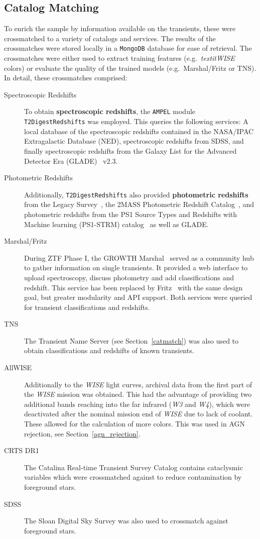 \subsection{Catalog Matching}
To enrich the sample by information available on the transients, these were crossmatched to a variety of catalogs and services. The results of the crossmatches were stored locally in a \texttt{MongoDB} database for ease of retrieval. The crossmatches were either used to extract training features (e.g.~\textit{textit{WISE}} colors) or evaluate the quality of the trained models (e.g.~Marshal/Fritz or TNS). In detail, these crossmatches comprised:

\begin{description}
  \item[Spectroscopic Redshifts] To obtain \textbf{spectroscopic redshifts}, the \texttt{AMPEL} module \texttt{T2DigestRedshifts} was employed. This queries the following services: A local database of the spectroscopic redshifts contained in the NASA/IPAC Extragalactic Database (NED), spectroscopic redshifts from SDSS, and finally spectroscopic redshifts from the Galaxy List for the Advanced Detector Era (GLADE)~ v2.3.
  \item[Photometric Redshifts] Additionally, \texttt{T2DigestRedshifts} also provided \textbf{photometric redshifts} from the Legacy Survey~, the 2MASS Photometric Redshift Catalog~, and photometric redshifts from the PS1 Source Types and Redshifts with Machine learning (PS1-STRM) catalog~ as well as GLADE.
  \item[Marshal/Fritz] During ZTF Phase I, the GROWTH Marshal~ served as a community hub to gather information on single transients. It provided a web interface to upload spectroscopy, discuss photometry and add classifications and redshift. This service has been replaced by Fritz~ with the same design goal, but greater modularity and API support. Both services were queried for transient classifications and redshifts.
  \item[TNS] The Transient Name Server (see Section~\ref{catmatch}) was also used to obtain classifications and redshifts of known transients.
  \item[AllWISE] Additionally to the \textit{WISE} light curves, archival data from the first part of the \textit{WISE} mission was obtained. This had the advantage of providing two additional bands reaching into the far infrared (\textit{W3} and \textit{W4}), which were deactivated after the nominal mission end of \textit{WISE} due to lack of coolant. These allowed for the calculation of more colors. This was used in AGN rejection, see Section~\ref{agn_rejection}.
  \item[CRTS DR1] The Catalina Real-time Transient Survey Catalog contains cataclysmic variables which were crossmatched against to reduce contamination by foreground stars.
  \item[SDSS] The Sloan Digital Sky Survey was also used to crossmatch against foreground stars.
\end{description}


